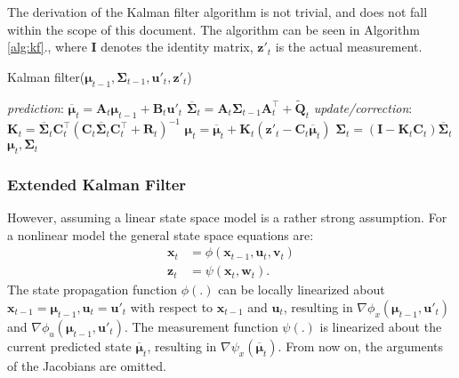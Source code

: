 The derivation of the Kalman filter algorithm is not trivial, and does not fall within the scope of this document. The algorithm can be seen in Algorithm \ref{alg:kf}., where $\mathbf{I}$ denotes the identity matrix, $\mathbf{z}'_t$ is the actual measurement.

\begin{algorithm}
    \caption{Kalman filter($\boldsymbol{\mu}_{t-1},\mathbf{\Sigma}_{t-1},\mathbf{u}'_t,\mathbf{z}'_t$)}\label{alg:kf}
    \begin{algorithmic}[1]
        \BState \emph{prediction}:
        \State\indent$\overline{\boldsymbol{\mu}}_t = \mathbf{A}_t{\boldsymbol{\mu}}_{t-1} + \mathbf{B}_t\mathbf{u}'_t$
        \State\indent $\overline{\mathbf{\Sigma}}_t = \mathbf{A}_t\mathbf{\Sigma}_{t-1}\mathbf{A}^\top_t + \tilde{\mathbf{Q}}_t$
        \BState \emph{update/correction}:
        \State\indent $\mathbf{K}_t = \overline{\mathbf{\Sigma}}_t\mathbf{C}_t^\top\left(\mathbf{C}_t\overline{\mathbf{\Sigma}}_t\mathbf{C}_t^\top+\mathbf{R}_t\right)^{-1}$
        \State\indent $\boldsymbol{\mu}_t = \overline{\boldsymbol{\mu}}_t + \mathbf{K}_t\left(\mathbf{z}'_t-\mathbf{C}_t\overline{\boldsymbol{\mu}}_t\right)$
        \State\indent $\mathbf{\Sigma}_t = \left(\mathbf{I}-\mathbf{K}_t\mathbf{C}_t\right)\overline{\mathbf{\Sigma}}_t$
        \State\Return $\boldsymbol{\mu}_t,\mathbf{\Sigma}_t$
    \end{algorithmic}
\end{algorithm}
\subsubsection{Extended Kalman Filter}
However, assuming a linear state space model is a rather strong assumption. For a nonlinear model the general state space equations are:
\begin{align}
    \mathbf{x}_t & = \phi(\mathbf{x}_{t-1},\mathbf{u}_t,\mathbf{v}_t) \label{eq:explicit-mot-eq} \\
    \mathbf{z}_t & = \psi(\mathbf{x}_t,\mathbf{w}_t).  \label{eq:explicit-meas-eq}
\end{align}
The state propagation function $\phi(.)$ can be locally linearized about $\mathbf{x}_{t-1} = \boldsymbol{\mu}_{t-1}, \mathbf{u}_t = \mathbf{u}'_t$ with respect to $\mathbf{x}_{t-1}$ and $\mathbf{u}_t$, resulting in $\nabla \phi _x(\boldsymbol{\mu}_{t-1},\mathbf{u}'_t)$ and $\nabla \phi_u(\boldsymbol{\mu}_{t-1},\mathbf{u}'_t)$.
The measurement function $\psi(.)$ is linearized about the current predicted state $\overline{\boldsymbol{\mu}}_t$,
resulting in $\nabla \psi_x(\overline{\boldsymbol{\mu}}_t)$.
From now on, the arguments of the Jacobians are omitted.

